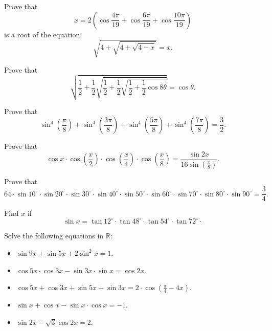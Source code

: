 \begin{question} Prove that $$x=2\left(\cos\frac{4\pi}{19}+\cos\frac{6\pi}{19}+\cos\frac{10\pi}{19}\right)$$ is a root of the equation:
\[\sqrt{4+\sqrt{4+\sqrt{4-x}}}=x.\]
\end{question}



\begin{question} Prove that
\[\sqrt{\frac12+\frac12 \sqrt{\frac12+\frac12 \sqrt{\frac12+\frac12 \cos 8\theta}}}=\cos \theta.\]
\end{question}


\begin{question} Prove that
\[ \sin^4 \left(\frac{\pi}{8}\right)+\sin^4 \left(\frac{3\pi}{8}\right)+\sin^4 \left(\frac{5\pi}{8}\right)+\sin^4 \left(\frac{7\pi}{8}\right)=\frac32.\]
\end{question}


\begin{question} Prove that
\[\cos x \cdot \cos \left(\frac{x}{2}\right) \cdot \cos \left(\frac{x}{4}\right) \cdot \cos \left(\frac{x}{8}\right)= \dfrac{\sin 2x}{\displaystyle 16 \sin \left(\frac{x}{8}\right)}.\]
\end{question}



\begin{question} Prove that
\[64 \cdot \sin 10^{\circ}\cdot \sin 20^{\circ}\cdot \sin 30^{\circ}\cdot \sin 40^{\circ}\cdot \sin 50^{\circ}\cdot \sin 60^{\circ}\cdot \sin 70^{\circ}\cdot \sin 80^{\circ}\cdot \sin 90^{\circ}=\dfrac34.\]
\end{question}



\begin{question} Find $x$ if
\[\sin x= \tan12^{\circ}\cdot \tan48^{\circ}\cdot \tan54^{\circ} \cdot \tan72^{\circ}\cdot\]
\end{question}



\begin{question} Solve the following equations in $\mathbb R$:
\begin{itemize}

\item $\sin 9x+ \sin 5x + 2\sin^2 x=1$.

\item $\cos 5x \cdot \cos 3x - \sin 3x \cdot \sin x = \cos 2x$.

\item $\displaystyle\cos 5x+\cos 3x+\sin 5x+\sin 3x=2 \cdot \cos\left(\frac{\pi}4 - 4x\right)$.

\item $\sin x + \cos x -\sin x \cdot \cos x= -1$.

\item $\sin 2x - \sqrt 3 \cos 2x = 2$.


\end{itemize}
\end{question}



